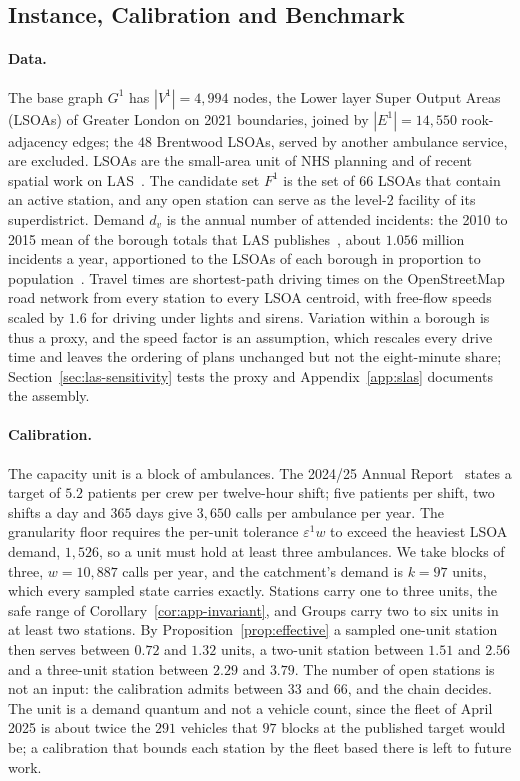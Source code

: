 \documentclass[11pt]{article}
\theoremstyle{definition}
\begin{document}
\subsection{Instance, Calibration and Benchmark}\label{sec:las-data}

\paragraph{Data.}
The base graph $G^1$ has $|V^1| = 4{,}994$ nodes, the Lower layer Super Output Areas (LSOAs) of Greater London on 2021 boundaries, joined by $|E^1| = 14{,}550$ rook-adjacency edges; the $48$ Brentwood LSOAs, served by another ambulance service, are excluded. LSOAs are the small-area unit of NHS planning and of recent spatial work on LAS~\citep{murphy2024socio}. The candidate set $F^1$ is the set of $66$ LSOAs that contain an active station, and any open station can serve as the level-2 facility of its superdistrict. Demand $d_v$ is the annual number of attended incidents: the 2010 to 2015 mean of the borough totals that LAS publishes~\citep{las_incidents}, about $1.056$ million incidents a year, apportioned to the LSOAs of each borough in proportion to population~\citep{ons_sape2024}. Travel times are shortest-path driving times on the OpenStreetMap road network from every station to every LSOA centroid, with free-flow speeds scaled by $1.6$ for driving under lights and sirens. Variation within a borough is thus a proxy, and the speed factor is an assumption, which rescales every drive time and leaves the ordering of plans unchanged but not the eight-minute share; Section~\ref{sec:las-sensitivity} tests the proxy and Appendix~\ref{app:slas} documents the assembly.

\paragraph{Calibration.}\label{sec:las-calibration}
The capacity unit is a block of ambulances. The 2024/25 Annual Report~\citep{las_ar_2024_25} states a target of $5.2$ patients per crew per twelve-hour shift; five patients per shift, two shifts a day and $365$ days give $3{,}650$ calls per ambulance per year. The granularity floor requires the per-unit tolerance $\varepsilon^1 w$ to exceed the heaviest LSOA demand, $1{,}526$, so a unit must hold at least three ambulances. We take blocks of three, $w = 10{,}887$ calls per year, and the catchment's demand is $k = 97$ units, which every sampled state carries exactly. Stations carry one to three units, the safe range of Corollary~\ref{cor:app-invariant}, and Groups carry two to six units in at least two stations. By Proposition~\ref{prop:effective} a sampled one-unit station then serves between $0.72$ and $1.32$ units, a two-unit station between $1.51$ and $2.56$ and a three-unit station between $2.29$ and $3.79$. The number of open stations is not an input: the calibration admits between $33$ and $66$, and the chain decides. The unit is a demand quantum and not a vehicle count, since the fleet of April 2025 is about twice the $291$ vehicles that $97$ blocks at the published target would be; a calibration that bounds each station by the fleet based there is left to future work.
\end{document}
